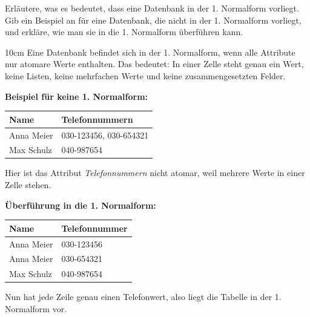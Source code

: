 \question[4]
Erläutere, was es bedeutet, dass eine Datenbank in der 1. Normalform vorliegt.
Gib ein Beispiel an für eine Datenbank, die nicht in der 1. Normalform vorliegt, 
und erkläre, wie man sie in die 1. Normalform überführen kann.


\begin{solutionbox}{10cm}   
Eine Datenbank befindet sich in der 1. Normalform, wenn alle Attribute nur atomare Werte enthalten.
Das bedeutet: In einer Zelle steht genau ein Wert, keine Listen, keine mehrfachen Werte und keine zusammengesetzten Felder.

\vspace{0.2cm}

\textbf{Beispiel für keine 1. Normalform:}

\begin{center}
\begin{tabular}{|l|l|}
\hline
Name & Telefonnummern \\
\hline
Anna Meier & 030-123456, 030-654321 \\
Max Schulz & 040-987654 \\
\hline
\end{tabular}
\end{center}

Hier ist das Attribut \textit{Telefonnummern} nicht atomar, weil mehrere Werte in einer Zelle stehen.

\vspace{0.2cm}

\textbf{Überführung in die 1. Normalform:}

\begin{center}
\begin{tabular}{|l|l|}
\hline
Name & Telefonnummer \\
\hline
Anna Meier & 030-123456 \\
Anna Meier & 030-654321 \\
Max Schulz & 040-987654 \\
\hline
\end{tabular}
\end{center}

Nun hat jede Zeile genau einen Telefonwert, also liegt die Tabelle in der 1. Normalform vor.

\end{solutionbox}